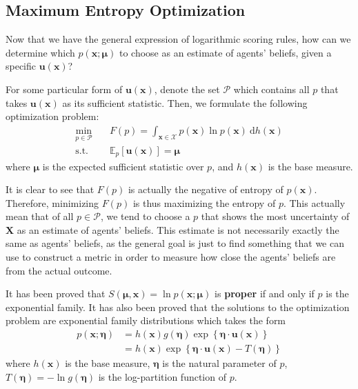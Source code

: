 \documentclass[12pt]{article}
\begin{document}
\subsection{Maximum Entropy Optimization}
Now that we have the general expression of logarithmic scoring rules, how can we determine which $p(\mathbf{x};\bm{\mu})$ to choose as an estimate of agents' beliefs, given a specific $\mathbf{u}(\mathbf{x})$?

For some particular form of $\mathbf{u}(\mathbf{x})$, denote the set $\mathcal{P}$ which contains all $p$ that takes $\mathbf{u}(\mathbf{x})$ as its sufficient statistic. Then, we formulate the following optimization problem:
\begin{align*}
    \min_{p\in \mathcal{P}} & \quad F(p)=\int_{\mathbf{x}\in \mathcal{X}}p(\mathbf{x})\ln p(\mathbf{x})\ \mathrm{d}h(\mathbf{x}) \\
    \mathrm{s.t.}           & \quad \mathbb{E}_p[\mathbf{u}(\mathbf{x})]=\bm{\mu}
\end{align*}
where $\bm{\mu}$ is the expected sufficient statistic over $p$, and $h(\mathbf{x})$ is the base measure.

It is clear to see that $F(p)$ is actually the negative of entropy of $p(\mathbf{x})$. Therefore, minimizing $F(p)$ is thus maximizing the entropy of $p$. This actually mean that of all $p\in \mathcal{P}$, we tend to choose a $p$ that shows the most uncertainty of $\mathbf{X}$ as an estimate of agents' beliefs. This estimate is not necessarily exactly the same as agents' beliefs, as the general goal is just to find something that we can use to construct a metric in order to measure how close the agents' beliefs are from the actual outcome.

It has been proved that $S(\bm{\mu},\mathbf{x})=\ln p(\mathbf{x};\bm{\mu})$ is \textbf{proper} if and only if $p$ is the exponential family. It has also been proved that the solutions to the optimization problem are exponential family distributions which takes the form
\begin{align*}
    p(\mathbf{x};\bm{\eta}) & =h(\mathbf{x})g(\bm{\eta})\exp\left\{ \bm{\eta}\cdot\mathbf{u}(\mathbf{x})\right\}  \\
                            & =h(\mathbf{x})\exp\left\{ \bm{\eta}\cdot\mathbf{u}(\mathbf{x})-T(\bm{\eta})\right\}
\end{align*}
where $h(\mathbf{x})$ is the base measure, $\bm{\eta}$ is the natural parameter of $p$, $T(\bm{\eta})=-\ln g(\bm{\eta})$ is the log-partition function of $p$.
\end{document}
